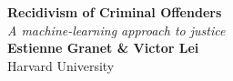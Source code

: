 \documentclass[a0,landscape]{a0poster}
\begin{document}


\begin{minipage}[b]{0.55\linewidth}
\veryHuge \color{NavyBlue} \textbf{Recidivism of Criminal Offenders} \color{Black}\\ %
\Huge\textit{A machine-learning approach to justice}\\[1cm] %
\huge \textbf{Estienne Granet \& Victor Lei}\\ %
\huge Harvard University\\ %
\end{minipage}


\vspace{1cm} %

\end{document}
